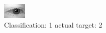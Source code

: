 \begin{figure}[h!]
\begin{center}
\includegraphics[width=0.60\columnwidth]{figures/ID419_class_1_target_2.png}
\end{center}
\caption{ Classification: 1 actual target: 2}
\label{fig:ID419_class_1_target_2}
\end{figure}

